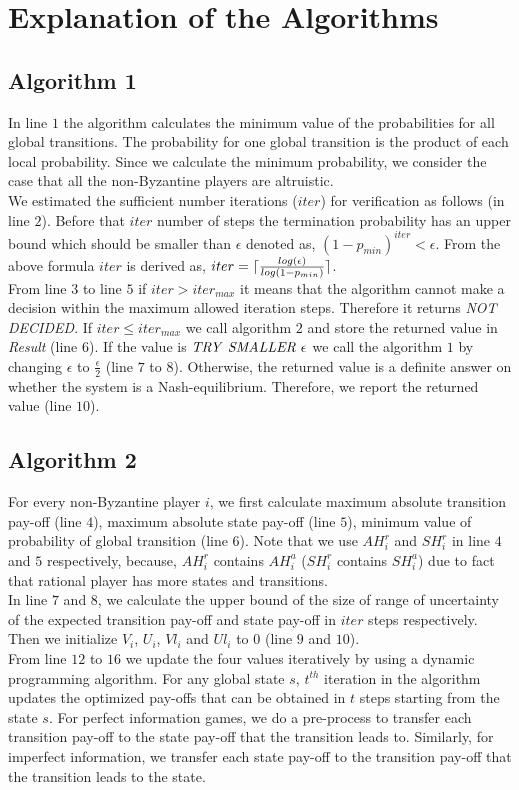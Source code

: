 \section{Explanation of the Algorithms}

\subsection{Algorithm 1}
In line $1$ the algorithm calculates the minimum value of the probabilities for all global transitions. The probability for one global transition is the product of each local probability. Since we calculate the minimum probability, we consider the case that all the non-Byzantine players are altruistic.\\
We estimated the sufficient number iterations ($iter$) for verification as follows (in line $2$). Before that $iter$ number of steps the termination probability has an upper bound which should be smaller than $\epsilon$ denoted as,
$(1-p_{min})^{iter} < \epsilon$. From the above formula $iter$ is derived as,
 $iter = \lceil\frac{log(\epsilon)}{log(1-p_{min})}\rceil$.\\
 From line $3$ to line $5$ if $iter > iter_{max}$ it means that the algorithm cannot make a decision within the maximum allowed iteration steps. Therefore it returns \textit{NOT DECIDED}. If $iter \le iter_{max}$ we call algorithm $2$ and store the returned value in \textit{Result} (line $6$). If the value is $\mi{TRY}\ \mi{SMALLER}\ \epsilon$ we call the algorithm $1$ by changing $\epsilon$ to $\frac{\epsilon}{2}$ (line $7$ to $8$). Otherwise, the returned value is a definite answer on whether the system is a Nash-equilibrium. Therefore, we report the returned value (line $10$).

\subsection{Algorithm 2}
For every non-Byzantine player $i$, we first calculate maximum absolute transition pay-off (line $4$), maximum absolute state pay-off (line $5$), minimum value of probability of global transition (line $6$). Note that we use $AH^r_i$ and $SH^r_i$ in line $4$ and $5$ respectively, because, $AH^r_i$ contains $AH^a_i$ ($SH^r_i$ contains $SH^a_i$) due to fact that rational player has more states and transitions.\\
In line $7$ and $8$, we calculate the upper bound of the size of range of uncertainty of the expected transition pay-off and state pay-off in $iter$ steps respectively. Then we initialize $V_i$, $U_i$, $Vl_i$ and $Ul_i$ to $0$ (line $9$ and $10$).\\
From  line $12$ to $16$ we update the four values iteratively by using a dynamic programming algorithm. For any global state $s$, $t^{th}$ iteration in the algorithm updates the optimized pay-offs that can be obtained in $t$ steps starting from the state $s$. For perfect information games, we do a pre-process to transfer each transition pay-off to the state pay-off that the transition leads to. Similarly, for imperfect information, we transfer each state pay-off to the transition pay-off that the transition leads to the state. 

